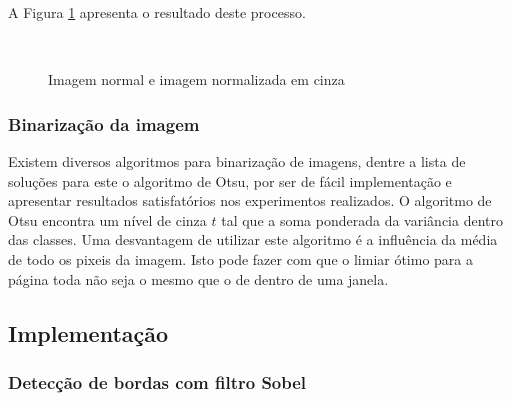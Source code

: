 \documentclass[12pt]{article}
\begin{document}
A Figura \ref{fig2} apresenta o resultado deste processo.

\begin{figure}[ht]
\centering
\mbox{\quad
{}}
\caption{Imagem normal e imagem normalizada em cinza} \label{fig2}
\end{figure}

\subsubsection{Binarização da imagem}

Existem diversos algoritmos para binarização de imagens, dentre a lista de soluções para este  o algoritmo de Otsu, por ser de fácil implementação e apresentar resultados satisfatórios nos experimentos realizados. O algoritmo de Otsu encontra um nível de cinza $t$ tal que a soma ponderada da variância dentro das classes.
Uma desvantagem de utilizar este algoritmo é a influência da média de todo os pixeis da imagem. Isto pode fazer com que o limiar ótimo para a página toda não seja o mesmo que o de dentro de uma janela.

    \subsection{Implementação}



\subsubsection{Detecção de bordas com filtro Sobel}
\end{document}
